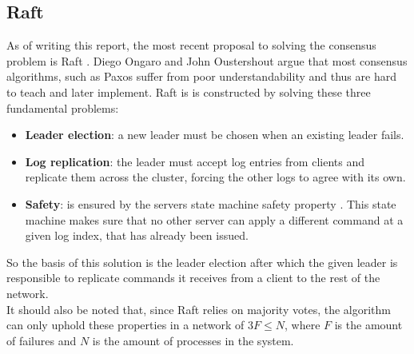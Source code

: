 \subsection{Raft}
As of writing this report, the most recent proposal to solving the consensus problem is Raft \cite{Raft}. Diego Ongaro and John Oustershout argue that most consensus algorithms, such as Paxos \cite{Paxos} suffer from poor understandability and thus are hard to teach and later implement. Raft is is constructed by solving these three fundamental problems:
\begin{itemize}
\item \textbf{Leader election}: a new leader must be chosen when an existing leader fails.
\item \textbf{Log replication}: the leader must accept log entries from clients and replicate them across the cluster, forcing the other logs to agree with its own.\cite{Raft}
\item \textbf{Safety}: is ensured by the servers state machine safety property \cite{Raft}. This state machine makes sure that no other server can apply a different command at a given log index, that has already been issued.
\end{itemize}
So the basis of this solution is the leader election after which the given leader is responsible to replicate commands it receives from a client to the rest of the network. \\
It should also be noted that, since Raft relies on majority votes, the algorithm can only uphold these properties in a network of $3F \leq N$, where $F$ is the amount of failures and $N$ is the amount of processes in the system. 
